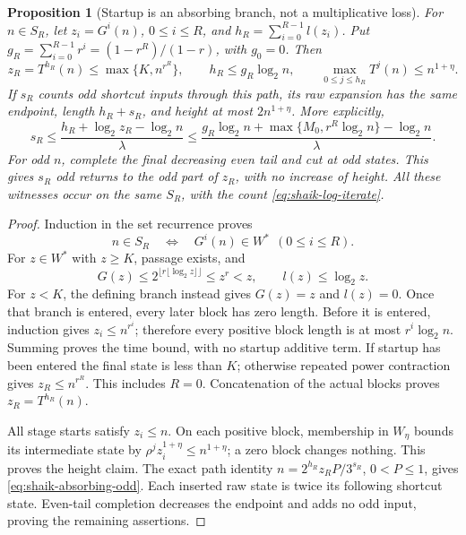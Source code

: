 \documentclass[11pt]{article}
\newtheorem{proposition}{Proposition}
\theoremstyle{remark}\newtheorem{remark}[proposition]{Remark}
\begin{document}
\begin{proposition}[Startup is an absorbing branch, not a multiplicative loss]
\label{prop:shaik-absorbing-startup}
For \(n\in S_R\), let \(z_i=G^i(n)\), \(0\le i\le R\), and
\(h_R=\sum_{i=0}^{R-1}l(z_i)\). Put
\(g_R=\sum_{i=0}^{R-1}r^i=(1-r^R)/(1-r)\), with \(g_0=0\).
Then
\begin{equation}\label{eq:shaik-absorbing-witness}
 z_R=T^{h_R}(n)\le\max\{K,n^{r^R}\},\qquad
 h_R\le g_R\log_2n,\qquad
 \max_{0\le j\le h_R}T^j(n)\le n^{1+\eta}.
\end{equation}
If \(s_R\) counts odd shortcut inputs through this path, its raw
expansion has the same endpoint, length \(h_R+s_R\), and height at
most \(2n^{1+\eta}\). More explicitly,
\begin{equation}\label{eq:shaik-absorbing-odd}
 s_R\le
 \frac{h_R+\log_2 z_R-\log_2n}{\lambda}
 \le\frac{g_R\log_2n+\max\{M_0,r^R\log_2n\}-\log_2n}{\lambda}.
\end{equation}
For odd \(n\), complete the final decreasing even tail and cut at odd
states. This gives \(s_R\) odd returns to the odd part of \(z_R\),
with no increase of height.
All these witnesses occur on the same \(S_R\), with the count
\eqref{eq:shaik-log-iterate}.
\end{proposition}
\begin{proof}
Induction in the set recurrence proves
\[
 n\in S_R\quad\Longleftrightarrow\quad
 G^i(n)\in W^*\ \ (0\le i\le R).
\]
For \(z\in W^*\) with \(z\ge K\), passage exists, and
\[
 G(z)\le 2^{\lfloor r\lfloor\log_2z\rfloor\rfloor}
       \le z^r<z,\qquad l(z)\le\log_2z .
\]
For \(z<K\), the defining branch instead gives \(G(z)=z\) and
\(l(z)=0\). Once that branch is entered, every later block has zero
length. Before it is entered, induction gives
\(z_i\le n^{r^i}\); therefore every positive block length is at most
\(r^i\log_2n\). Summing proves the time bound, with no startup
additive term. If startup has been entered the final state is less
than \(K\); otherwise repeated power contraction gives
\(z_R\le n^{r^R}\). This includes \(R=0\).
Concatenation of the actual blocks proves \(z_R=T^{h_R}(n)\).

All stage starts satisfy \(z_i\le n\). On each positive block,
membership in \(W_\eta\) bounds its intermediate state by
\(\rho^j z_i^{1+\eta}\le n^{1+\eta}\); a zero block changes nothing.
This proves the height claim. The exact path identity
\(n=2^{h_R}z_R P/3^{s_R}\), \(0<P\le1\), gives
\eqref{eq:shaik-absorbing-odd}. Each inserted raw state is twice its
following shortcut state. Even-tail completion decreases the endpoint
and adds no odd input, proving the remaining assertions.
\end{proof}
\end{document}
